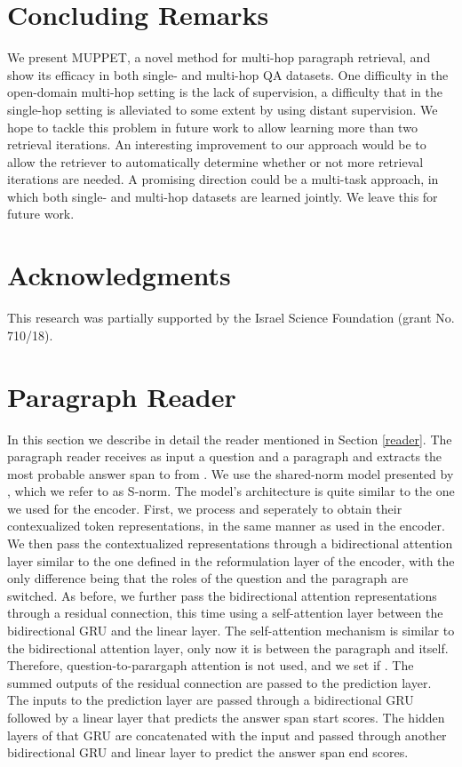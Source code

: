 \documentclass[11pt,a4paper,dvipsnames]{article}
\begin{document}
\section{Concluding Remarks}
We present MUPPET, a novel method for multi-hop paragraph retrieval, and show its efficacy in both single- and multi-hop QA datasets. One difficulty in the open-domain multi-hop setting is the lack of supervision, a difficulty that in the single-hop setting is alleviated to some extent by using distant supervision. We hope to tackle this problem in future work to allow learning more than two retrieval iterations. 
An interesting improvement to our approach would be to allow the retriever to automatically determine whether or not more retrieval iterations are needed. A promising direction could be a multi-task approach, in which both single- and multi-hop datasets are learned jointly. We leave this for future work.




\section*{Acknowledgments}
This research was partially supported by the Israel Science Foundation (grant No. 710/18).




\newpage

\appendix


\section{Paragraph Reader}
\label{sec:sup_reader}
In this section we describe in detail the reader mentioned in Section \ref{reader}.
The paragraph reader receives as input a question  and a paragraph  and extracts the most probable answer span to  from .
We use the shared-norm model presented by \citet{GardnerC18snorm}, which we refer to as S-norm. The model's architecture is quite similar to the one we used for the encoder. First, we process  and  seperately to obtain their contexualized token representations, in the same manner as used in the encoder. We then pass the contextualized representations through a bidirectional attention layer similar to the one defined in the reformulation layer of the encoder, with the only difference being that the roles of the question and the paragraph are switched. As before, we further pass the bidirectional attention representations through a residual connection, this time using a self-attention layer between the bidirectional GRU and the linear layer. The self-attention mechanism is similar to the bidirectional attention layer, only now it is between the paragraph and itself. Therefore, question-to-parargaph attention is not used, and we set  if . The summed outputs of the residual connection are passed to the prediction layer. The inputs to the prediction layer are passed through a bidirectional GRU followed by a linear layer that predicts the answer span start scores. The hidden layers of that GRU are concatenated with the input and passed through another bidirectional GRU and linear layer to predict the answer span end scores.
\end{document}
